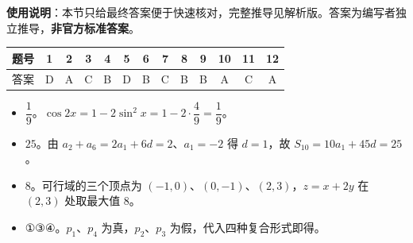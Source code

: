 
\begin{gknotice}
\textbf{使用说明}：本节只给最终答案便于快速核对，完整推导见解析版。答案为编写者独立推导，\textbf{非官方标准答案}。
\end{gknotice}

\begin{center}\begin{tabular}{ccccccccccccc}
\toprule
题号 & 1 & 2 & 3 & 4 & 5 & 6 & 7 & 8 & 9 & 10 & 11 & 12 \\
\midrule
答案 & D & A & C & B & D & B & C & B & B & A & C & A \\
\bottomrule
\end{tabular}\end{center}

\begin{itemize}[leftmargin=2.6em]
  \item[\textbf{13.}] $\dfrac19$。$\cos2x=1-2\sin^2x=1-2\cdot\dfrac49=\dfrac19$。
  \item[\textbf{14.}] $25$。由 $a_2+a_6=2a_1+6d=2$、$a_1=-2$ 得 $d=1$，故 $S_{10}=10a_1+45d=25$。
  \item[\textbf{15.}] $8$。可行域的三个顶点为 $(-1,0)$、$(0,-1)$、$(2,3)$，$z=x+2y$ 在 $(2,3)$ 处取最大值 $8$。
  \item[\textbf{16.}] ①③④。$p_1$、$p_4$ 为真，$p_2$、$p_3$ 为假，代入四种复合形式即得。
\end{itemize}

